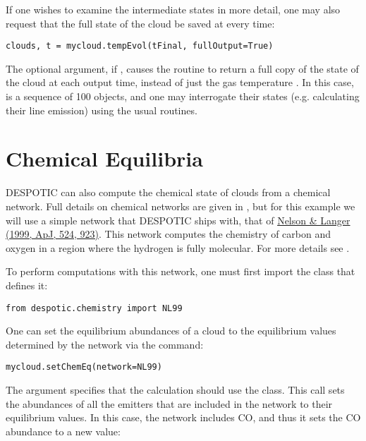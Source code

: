 \documentclass[letterpaper,10pt,english]{sphinxmanual}
\begin{document}
If one wishes to examine the intermediate states in more detail, one
may also request that the full state of the cloud be saved at every
time:

\begin{Verbatim}[commandchars=\\\{\}]
clouds, t = mycloud.tempEvol(tFinal, fullOutput=True)
\end{Verbatim}

The  optional argument, if , causes the routine
to return a full copy of the state of the cloud at each output time,
instead of just the gas temperature . In this case, 
is a sequence of 100  objects, and one may interrogate their
states (e.g. calculating their line emission) using the usual
routines.


\section{Chemical Equilibria}
\label{functions:chemical-equilibria}\label{functions:ssec-chem-eq}
DESPOTIC can also compute the chemical state of clouds from a chemical
network. Full details on chemical networks are given in
{\hyperref[chemistry:sec\string-chemistry]{}}, but for this example we will use a simple network
that DESPOTIC ships with, that of \href{http://adsabs.harvard.edu/abs/1999ApJ...524..923N}{Nelson \& Langer (1999, ApJ,
524, 923)}. This
network computes the chemistry of carbon and oxygen in a region where
the hydrogen is fully molecular. For more details see
{\hyperref[chemistry:sssec\string-nl99]{}}.

To perform computations with this network, one must first import the
class that defines it:

\begin{Verbatim}[commandchars=\\\{\}]
from despotic.chemistry import NL99
\end{Verbatim}

One can set the equilibrium abundances of a cloud to the equilibrium
values determined by the network via the command:

\begin{Verbatim}[commandchars=\\\{\}]
mycloud.setChemEq(network=NL99)
\end{Verbatim}

The argument  specifies that the calculation should use the
 class. This call sets the abundances of all the emitters that
are included in the network to their equilibrium values. In this case,
the network includes CO, and thus it sets the CO abundance to a new
value:
\end{document}
